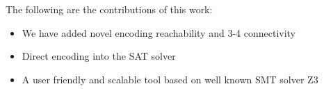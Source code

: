 The following are the contributions of this work:
\begin{itemize}
\item We have added novel encoding reachability and 3-4 connectivity
\item Direct encoding into the SAT solver
\item A user friendly and scalable tool based on well known SMT solver Z3
\end{itemize}


